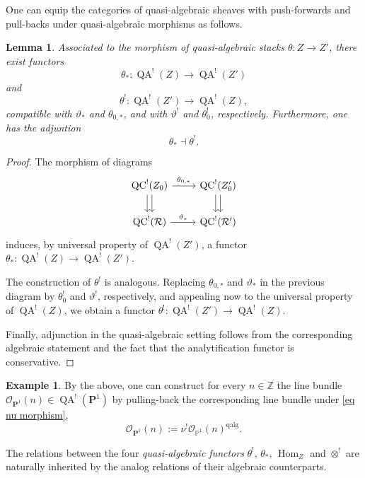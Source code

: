 \documentclass[11pt, a4paper]{amsart}
\numberwithin{equation}{section}
\newtheorem{lemma}[theorem]{Lemma}
\theoremstyle{definition}
\newtheorem{example}[theorem]{Example}
\theoremstyle{remark}
\DeclareMathOperator{\Hom}{Hom}
\DeclareMathOperator{\QC}{QC}
\DeclareMathOperator{\QA}{QA}
\DeclareMathOperator{\qalg}{\mathrm{qalg}}
\newcommand{\Oo}{\mathcal{O}}
\newcommand{\Rr}{\mathcal{R}}
\renewcommand{\P}{\mathbf{P}}
\newcommand{\ZZ}{\mathbb{Z}}
\newcommand{\PP}{\mathbb{P}}
\renewcommand{\to}{\longrightarrow}
\begin{document}
One can equip the categories of quasi-algebraic sheaves with push-forwards and pull-backs under quasi-algebraic morphisms as follows.

\begin{lemma} \label{lm qalg push and pull}
Associated to the morphism of quasi-algebraic stacks $\theta : Z \to Z'$, there exist functors
\[
\theta_{*} : \QA^!(Z) \to \QA^!(Z')
\]
and
\[
\theta^! : \QA^!(Z') \to \QA^!(Z),
\]
compatible with $\vartheta_*$ and $\theta_{0, *}$, and with $\vartheta^!$ and $\theta_{0}^!$, respectively. Furthermore, one has the adjuntion
\begin{equation} \label{eq qalg adjunction}
\theta_* \dashv \theta^!.
\end{equation}
\end{lemma}

\begin{proof}
The morphism of diagrams
\[\begin{tikzcd}
	{\QC^!(Z_0)} & {\QC^!(Z_0')} \\
	{\QC^!(\Rr)} & {\QC^!(\Rr')}
	\arrow["{\theta_{0,*}}", from=1-1, to=1-2]
	\arrow[shift right, from=1-1, to=2-1]
	\arrow[shift left, from=1-1, to=2-1]
	\arrow[shift right, from=1-2, to=2-2]
	\arrow[shift left, from=1-2, to=2-2]
	\arrow["{\vartheta_*}", from=2-1, to=2-2]
\end{tikzcd}\]
induces, by universal property of $\QA^!(Z')$, a functor $\theta_*: \QA^!(Z) \to \QA^!(Z')$.

The construction of $\theta^!$ is analogous. Replacing $\theta_{0,*}$ and $\vartheta_*$ in the previous diagram by $\theta_0^!$ and $\vartheta^!$, respectively, and appealing now to the universal property of $\QA^!(Z)$, we obtain a functor $\theta^!: \QA^!(Z') \to \QA^!(Z)$.

Finally, adjunction in the quasi-algebraic setting follows from the corresponding algebraic statement and the fact that the analytification functor is conservative.
\end{proof}

\begin{example} \label{ex line bundles on PP^1 twist}
By the above, one can construct for every $n \in \ZZ$ the line bundle $\Oo_{\P^1}(n) \in \QA^!(\P^1)$ by pulling-back the corresponding line bundle under \eqref{eq nu morphism},
\[
\Oo_{\P^1}(n) := \nu^!\Oo_{\PP^1}(n)^{\qalg}.
\]
\end{example}



 


The relations between the four {\it quasi-algebraic functors} $\theta^!$, $\theta_*$, $\Hom_Z$ and $\otimes^!$ are naturally inherited by the analog relations of their algebraic counterparts. 
\end{document}
